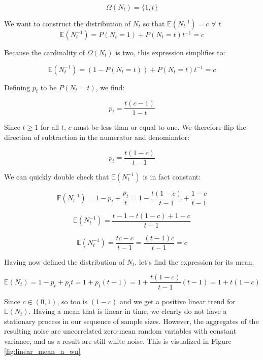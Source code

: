 \documentclass{TUT}
\numberwithin{equation}{section}
\theoremstyle{plain}
\begin{document}
$$ \Omega(N_t) = \{1,t\} $$

We want to construct the distribution of $N_t$ so that $\mathbb{E}(N_t^{-1}) = c$ $\forall$ $t$
$$ \mathbb{E}(N_t^{-1}) = P(N_t=1) + P(N_t=t)t^{-1} = c $$

Because the cardinality of $\Omega(N_t)$ is two, this expression simplifies to:

$$ \mathbb{E}(N_t^{-1}) = (1-P(N_t=t)) + P(N_t=t)t^{-1} = c $$

Defining $p_t$ to be $P(N_t = t)$, we find:




$$ p_t = \frac{t(c-1)}{1-t} $$

Since $t \geq 1$ for all $t$, $c$ must be less than or equal to one. We therefore flip the direction of subtraction in the numerator and denominator:

$$ p_t = \frac{t(1-c)}{t-1} $$

We can quickly double check that $\mathbb{E}(N_t^{-1})$ is in fact constant:

$$ \mathbb{E}(N_t^{-1}) = 1-p_t + \frac{p_t}{t} = 1 - \frac{t(1-c)}{t-1} + \frac{1-c}{t-1} $$

$$ \mathbb{E}(N_t^{-1}) = \frac{t-1 - t(1-c) + 1-c}{t-1} $$

$$ \mathbb{E}(N_t^{-1}) = \frac{tc - c}{t-1} = \frac{(t-1)c}{t-1} = c $$

Having now defined the distribution of $N_t$, let's find the expression for its mean.

$$ \mathbb{E}(N_t) = 1-p_t + p_tt = 1 + p_t(t-1) = 1 + \frac{t(1-c)}{t-1}(t-1) = 1 + t(1-c) $$

Since $c\in (0,1)$, so too is $(1-c)$ and we get a positive linear trend for $\mathbb{E}(N_t)$. Having a mean that is linear in time, we clearly do not have a stationary process in our sequence of sample sizes. However, the aggregates of the resulting noise are uncorrelated zero-mean random variables with constant variance, and as a result are still white noise. This is visualized in Figure \ref{fig:linear_mean_n_wn}
\end{document}
